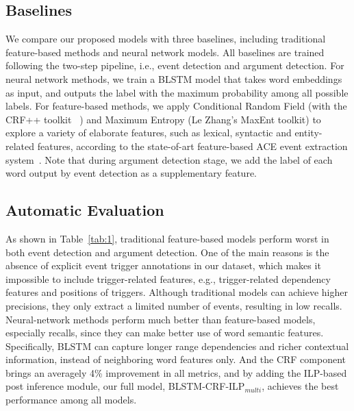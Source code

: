 \subsection{Baselines}
We compare our proposed models with three baselines, including traditional feature-based methods and neural network models. All baselines are trained following the two-step pipeline, i.e., event detection and argument detection.
For neural network methods, we train a  BLSTM model that takes word embeddings as input, and outputs the label with the maximum probability among all possible labels. 
For feature-based methods, we apply Conditional Random Field \cite{lafferty2001conditional} (with the CRF++ toolkit~\cite{kudo2005crf++} ) and Maximum Entropy \cite{berger1996maximum} (Le Zhang's MaxEnt toolkit) to explore a variety of elaborate features, such as lexical, syntactic and entity-related features, according to the state-of-art feature-based ACE event extraction system~\cite{li2013joint}. Note that during argument detection stage, we add the label of each word output by event detection as a supplementary feature.

\subsection{Automatic Evaluation}
As shown in Table~\ref{tab:1}, traditional feature-based models perform worst in both event detection and argument detection. 
One of the main reasons is the absence of explicit event trigger annotations in our dataset, which makes it impossible to include trigger-related features, e.g., trigger-related dependency features and positions of triggers. 
Although traditional models can achieve higher precisions, they only extract a limited number of events, resulting in low recalls. 
Neural-network methods perform much better than feature-based models, especially recalls, since they can make better use of word semantic features. Specifically, BLSTM can capture longer range dependencies and richer contextual information, instead of neighboring word features only.
And the CRF component brings an averagely 4\% improvement in all metrics, and by adding the ILP-based post inference module, our full model, BLSTM-CRF-ILP$_{multi}$, achieves the best performance among all models. 

